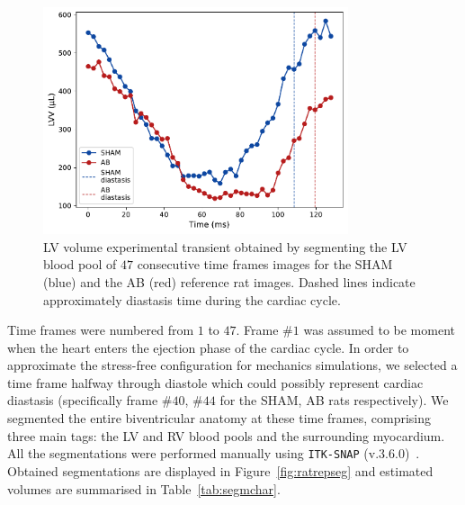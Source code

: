 \begin{figure}[!ht]
    \myfloatalign
    \includegraphics[width=0.8\textwidth]{figures/chapter04/lvv_experimental_transient.pdf}
    \caption{LV volume experimental transient obtained by segmenting the LV blood pool of $47$ consecutive time frames images for the SHAM (blue) and the AB (red) reference rat images. Dashed lines indicate approximately diastasis time during the cardiac cycle.}
    \label{fig:lvvexptransients}
\end{figure}

\vspace{0.2cm}
Time frames were numbered from $1$ to $47$. Frame $\#1$ was assumed to be moment when the heart enters the ejection phase of the cardiac cycle. In order to approximate the stress-free configuration for mechanics simulations, we selected a time frame halfway through diastole which could possibly represent cardiac diastasis (specifically frame $\#40$, $\#44$ for the SHAM, AB rats respectively). We segmented the entire biventricular anatomy at these time frames, comprising three main tags: the LV and RV blood pools and the surrounding myocardium. All the segmentations were performed manually using \texttt{ITK-SNAP} (v.$3.6.0$)~\cite{Yushkevich:2006}. Obtained segmentations are displayed in Figure~\ref{fig:ratrepseg} and estimated volumes are summarised in Table~\ref{tab:segmchar}.

